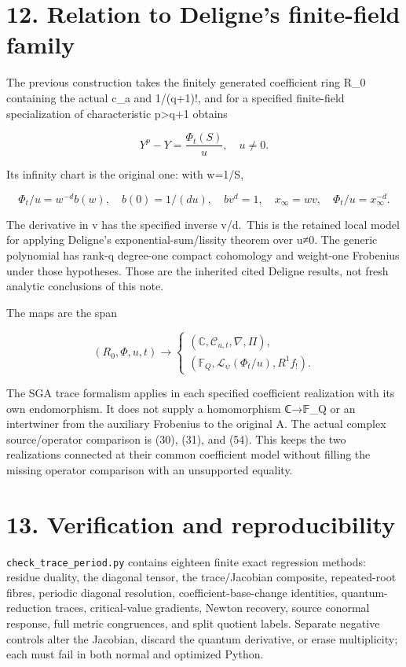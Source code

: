 \documentclass[
  11pt,
]{article}
\begin{document}
\section{12. Relation to Deligne's finite-field
family}\label{relation-to-delignes-finite-field-family}

The previous construction takes the finitely generated coefficient ring
R\_0 containing the actual c\_a and 1/(q+1)!, and for a specified
finite-field specialization of characteristic p\textgreater q+1 obtains

\[
Y^p-Y=\frac{\Phi_t(S)}u,\quad u\ne0.
\tag{60}
\]

Its infinity chart is the original one: with w=1/S,

\[
\Phi_t/u=w^{-d}b(w),\quad b(0)=1/(du),\quad
b v^d=1,\quad x_\infty=wv,\quad \Phi_t/u=x_\infty^{-d}.
\tag{61}
\]

The derivative in v has the specified inverse v/d.~This is the retained
local model for applying Deligne's exponential-sum/lissity theorem over
u≠0. The generic polynomial has rank-q degree-one compact cohomology and
weight-one Frobenius under those hypotheses. Those are the inherited
cited Deligne results, not fresh analytic conclusions of this note.

The maps are the span

\[
(R_0,\Phi,u,t)\longrightarrow
\begin{cases}
(\mathbb C,\mathcal C_{u,t},\nabla,\Pi),\\
(\mathbb F_Q,\mathcal L_\psi(\Phi_t/u),R^1f_!).
\end{cases}
\tag{62}
\]

The SGA trace formalism applies in each specified coefficient
realization with its own endomorphism. It does not supply a homomorphism
ℂ→𝔽\_Q or an intertwiner from the auxiliary Frobenius to the original A.
The actual complex source/operator comparison is (30), (31), and (54).
This keeps the two realizations connected at their common coefficient
model without filling the missing operator comparison with an
unsupported equality.

\section{13. Verification and
reproducibility}\label{verification-and-reproducibility}

\texttt{check\_trace\_period.py} contains eighteen finite exact
regression methods: residue duality, the diagonal tensor, the
trace/Jacobian composite, repeated-root fibres, periodic diagonal
resolution, coefficient-base-change identities, quantum-reduction
traces, critical-value gradients, Newton recovery, source conormal
response, full metric congruences, and split quotient labels. Separate
negative controls alter the Jacobian, discard the quantum derivative, or
erase multiplicity; each must fail in both normal and optimized Python.
\end{document}
